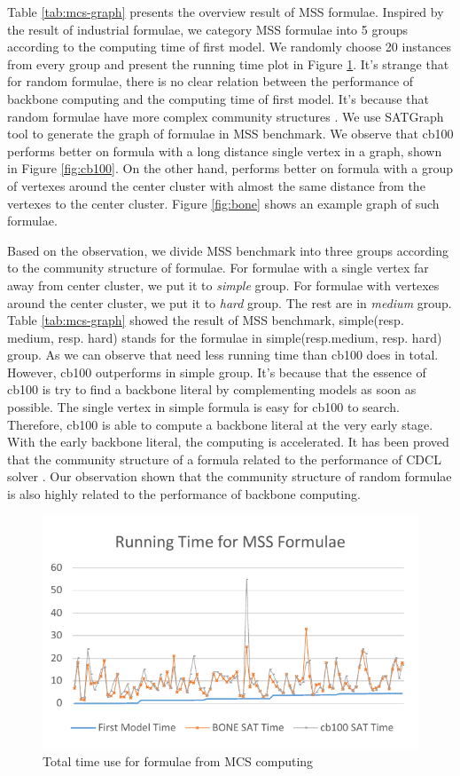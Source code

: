 Table \ref{tab:mcs-graph} presents the overview result of MSS formulae. Inspired by the result of industrial formulae, we category MSS formulae into 5 groups according to the computing time of first model. We randomly choose 20 instances from every group and present the running time plot in Figure \ref{fig:mcs-time}. It's strange that for random formulae, there is no clear relation between the performance of backbone computing and the computing time of first model. It's because that random formulae have more complex community structures \cite{NZG2014,LJG2015SAT,LJG015}. We use SATGraph \cite{NZW2015} tool to generate the graph of formulae in MSS benchmark. We observe that cb100 performs better on formula with a long distance single vertex in a graph, shown in Figure \ref{fig:cb100}. On the other hand, \tool performs better on formula with a group of vertexes around the center cluster with almost the same distance from the vertexes to the center cluster. Figure \ref{fig:bone} shows an example graph of such formulae.

Based on the observation, we divide MSS benchmark into three groups according to the community structure of formulae. For formulae with a single vertex far away from center cluster, we put it to \emph{simple} group. For formulae with vertexes around the center cluster, we put it to \emph{hard} group. The rest are in \emph{medium} group. Table \ref{tab:mcs-graph} showed the result of MSS benchmark, simple(resp. medium, resp. hard) stands for the formulae in simple(resp.medium, resp. hard) group. As we can observe that \tool need less running time than cb100 does in total. However, cb100 outperforms \tool in simple group. It's because that the essence of cb100 is try to find a backbone literal by complementing models as soon as possible. The single vertex in simple formula is easy for cb100 to search. Therefore, cb100 is able to compute a backbone literal at the very early stage. With the early backbone literal, the computing is accelerated. It has been proved that the community structure of a formula related to the performance of CDCL solver \cite{NZG2014}. Our observation shown that the community structure of random formulae is also highly related to the performance of backbone computing.

\begin{figure}
    \centering
    \includegraphics[scale=0.7]{mcs.pdf}
   \caption{Total time use for formulae from MCS computing}
   \label{fig:mcs-time}
\end{figure}


